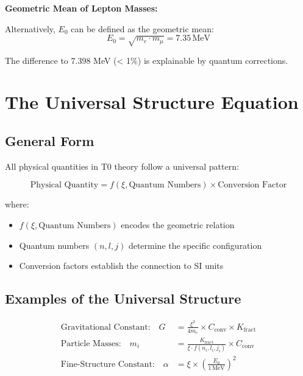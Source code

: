 	\begin{alternative}
		\textbf{Geometric Mean of Lepton Masses:}
		
		Alternatively, $E_0$ can be defined as the geometric mean:
		\begin{equation}
			E_0 = \sqrt{m_e \cdot m_\mu} = 7.35\,\mathrm{MeV}
		\end{equation}
		
		The difference to 7.398 MeV (< 1\%) is explainable by quantum corrections.
	\end{alternative}
	
	\section{The Universal Structure Equation}
	
	\subsection{General Form}
	
	All physical quantities in T0 theory follow a universal pattern:
	
	\begin{equation}
		\boxed{\text{Physical Quantity} = f(\xi, \text{Quantum Numbers}) \times \text{Conversion Factor}}
		\label{eq:universal_pattern}
	\end{equation}
	
	where:
	\begin{itemize}
		\item $f(\xi, \text{Quantum Numbers})$ encodes the geometric relation
		\item Quantum numbers $(n,l,j)$ determine the specific configuration
		\item Conversion factors establish the connection to SI units
	\end{itemize}
	
	\subsection{Examples of the Universal Structure}
	
	\begin{align}
		\text{Gravitational Constant:} \quad G &= \frac{\xi^2}{4m_e} \times C_{\text{conv}} \times K_{\text{fract}} \\
		\text{Particle Masses:} \quad m_i &= \frac{K_{\text{fract}}}{\xi \cdot f(n_i,l_i,j_i)} \times C_{\text{conv}} \\
		\text{Fine-Structure Constant:} \quad \alpha &= \xi \times \left(\frac{E_0}{1\,\mathrm{MeV}}\right)^2
	\end{align}
	
